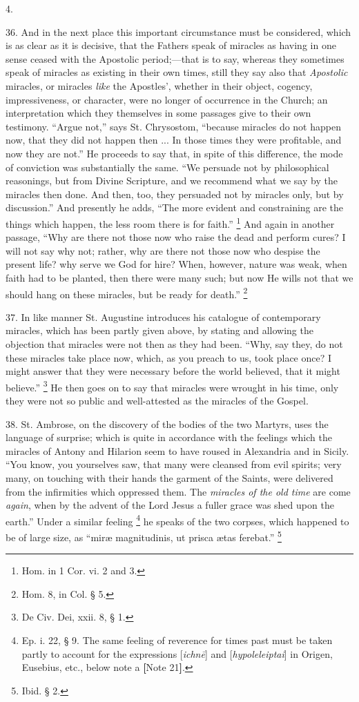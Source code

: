 4.

36.
And in the next place this important circumstance must be considered,
which is as clear as it is decisive, that the Fathers speak of
miracles as having in one sense ceased with the Apostolic
period;—that is to say, whereas they sometimes speak of miracles as
existing in their own times, still they say also that \emph{Apostolic}
miracles, or miracles \emph{like} the Apostles', whether in their
object, cogency, impressiveness, or character, were no longer of
occurrence in the Church; an interpretation which they themselves in
some passages give to their own testimony. ``Argue not,'' says St.
Chrysostom, ``because miracles do not happen now, that they did not
happen then ... In those times they were profitable, and now they are
not.'' He proceeds to say that, in spite of this difference, the mode
of conviction was substantially the same. ``We persuade not by
philosophical reasonings, but from Divine Scripture, and we recommend
what we say by the miracles then done. And then, too, they persuaded
not by miracles only, but by discussion.'' And presently he adds, ``The
more evident and constraining are the things which happen, the less
room there is for faith.'' \footnote{Hom. in 1 Cor. vi. 2 and 3.} And again in another passage, ``Why
are there not those now who raise the dead and perform cures? I will
not say why not; rather, why are there not those now who despise the
present life? why serve we God for hire? When, however, nature was
weak, when faith had to be planted, then there were many such; but now
He wills not that we should hang on these miracles, but be ready for
death.'' \footnote{Hom. 8, in Col. § 5.}

37.
In like manner St. Augustine introduces his catalogue of
contemporary miracles, which has been partly given above, by stating
and allowing the objection that miracles were not then as they had
been. ``Why, say they, do not these miracles take place now, which, as
you preach to us, took place once? I might answer that they were
necessary before the world believed, that it might believe.'' \footnote{De Civ. Dei, xxii. 8, § 1.}
He then goes on to say that miracles were wrought in his time, only
they were not so public and well-attested as the miracles of the
Gospel.

38.
St. Ambrose, on the discovery of the bodies of the two Martyrs, uses
the language of surprise; which is quite in accordance with the
feelings which the miracles of Antony and Hilarion seem to have roused
in Alexandria and in Sicily. ``You know, you yourselves saw, that many
were cleansed from evil spirits; very many, on touching with their
hands the garment of the Saints, were delivered from the infirmities
which oppressed them. The \emph{miracles of the old time} are come \emph{again},
when by the advent of the Lord Jesus a fuller grace was shed upon the
earth.'' Under a similar feeling \footnote{Ep. i. 22, § 9. The same feeling of
reverence for times past must be taken partly to account for the
expressions [\emph{ichn\={e}}] and [\emph{hypoleleiptai}] in Origen,
Eusebius, etc., below note a \textbf{[}Note
21\textbf{]}.} he speaks of the two
corpses, which happened to be of large size, as ``miræ magnitudinis,
ut prisca ætas ferebat.'' \footnote{Ibid. § 2.}

